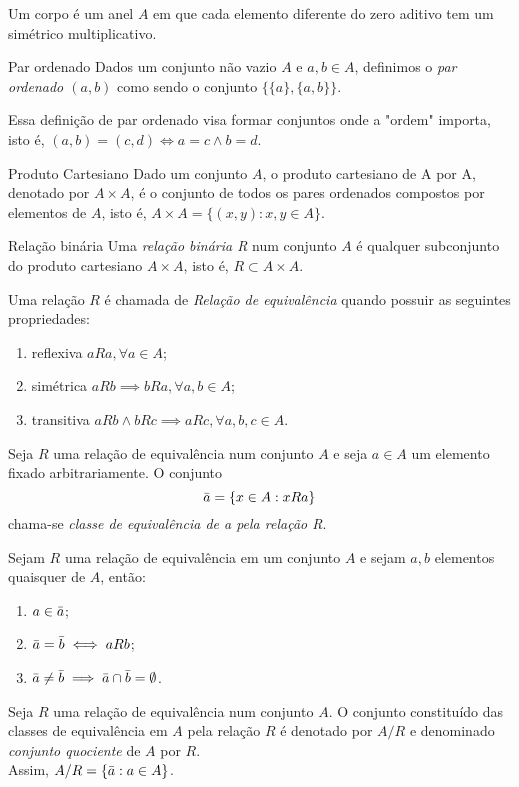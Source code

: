 \documentclass[../main.tex]{subfiles}
\begin{document}
\begin{defi}
    Um corpo é um anel $A$ em que cada elemento diferente do zero aditivo tem um simétrico multiplicativo.
\end{defi}

\begin{defi}{Par ordenado}\label{def-par-ord}
     Dados um conjunto não vazio $A$ e $a,b \in A$, definimos o \emph{par ordenado $(a,b)$} como sendo o conjunto $\{\{a\}, \{a,b\}\}$.
\end{defi}
\begin{obs}
    Essa definição de par ordenado visa formar conjuntos onde a "ordem" importa, isto é, $(a , b) = (c , d) \iff a=c \land b=d$.
\end{obs}
\begin{defi}{Produto Cartesiano}\label{def-prod-cart}
     Dado um conjunto $A$, o produto cartesiano de A por A, denotado por $A \times A$, é o conjunto de todos os pares ordenados compostos por elementos de $A$, isto é, $A \times A = \{ (x,y) : x,y \in A \}$.
\end{defi}
\begin{defi}{Relação binária}
    Uma \emph{relação binária R} num conjunto $A$ é qualquer subconjunto do produto cartesiano $A \times A$, isto é, $R \subset A \times A$.
\end{defi}
\begin{defi}
    Uma relação $R$ é chamada de \emph{Relação de equivalência} quando possuir as seguintes propriedades:
    \begin{enumerate}[label=(\roman*)]
        \item reflexiva $aRa, \forall a \in A$;
        \item simétrica $aRb \implies bRa, \forall a,b \in A$;
        \item transitiva $aRb \land bRc \implies aRc, \forall a,b,c \in A$.
    \end{enumerate}
\end{defi}
\begin{defi}
    Seja $R$ uma relação de equivalência num conjunto $A$ e seja $a \in A$ um elemento fixado arbitrariamente. O conjunto \\
    $$\Bar{a} = \{x \in A : xRa\}$$
    chama-se \emph{classe de equivalência de a pela relação R}.
\end{defi}
\begin{teo}
    Sejam $R$ uma relação de equivalência em um conjunto $A$ e sejam $a,b$ elementos quaisquer de $A$, então:
    \begin{enumerate}
        \item $a \in \Bar{a}$;
        \item $\Bar{a} = \Bar{b} \iff aRb$;
        \item $\Bar{a} \neq \Bar{b} \implies \Bar{a} \cap \Bar{b} = \emptyset $.
    \end{enumerate}
\end{teo}
\begin{defi}
    Seja $R$ uma relação de equivalência num conjunto $A$. O conjunto constituído das classes de equivalência em $A$ pela relação $R$ é denotado por $A / R$ e denominado \emph{conjunto quociente} de $A$ por $R$. \\
    Assim, $A / R = \{\Bar{a} : a \in A\}$.
\end{defi}
\end{document}
